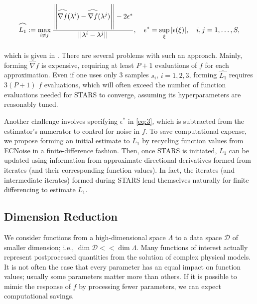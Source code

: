 \documentclass{amsart}
\newcommand{\D}{\mathcal{D}}
\newcommand\reallywidehat[1]{\arraycolsep=0pt\relax%
\begin{array}{c}
\stretchto{
  \scaleto{
    \scalerel*[\widthof{\ensuremath{#1}}]{\kern-.5pt\bigwedge\kern-.5pt}
    {\rule[-\textheight/2]{1ex}{\textheight}} %
  }{\textheight} %
}{0.5ex}\\           %
#1\\                 %
\rule{-1ex}{0ex}
\end{array}
}
\begin{document}
\begin{equation} \label{eq:3}
\reallywidehat{L_1}:= \max_{i \neq j} \frac{\left|\left|\reallywidehat{\nabla f}(\lambda^{i})-\reallywidehat{\nabla f}(\lambda^{j})\right|\right|-2\epsilon^*}{||\lambda^{i}-\lambda^{j}||}, \quad \epsilon^*=\sup_\xi |\epsilon(\xi)|, \quad i,j=1,\ldots, S,
\end{equation} 

\noindent which is %
given in \cite{Calliess}. There are several problems with such an approach. Mainly, forming $\hat{\nabla} f$ is expensive, requiring at least $P+1$ evaluations of $f$ for each approximation. Even if one uses only 3 samples $s_i$, $i=1,2,3$, forming $\hat{L_1}$ requires $3(P+1)$ $f$ evaluations, which will often exceed the number of function evaluations needed for STARS to converge, assuming its hyperparameters are reasonably tuned.

Another challenge involves specifying $\epsilon^*$ in \eqref{eq:3}, which is subtracted from the estimator's numerator to control for noise in $f$. To save computational expense, we propose forming an initial estimate to $L_1$ by recycling function values from ECNoise in a finite-difference fashion. Then, once STARS is initiated, $L_1$ can be updated using information from approximate directional derivatives formed from iterates (and their corresponding function values). In fact, the iterates (and intermediate iterates) formed during STARS lend themselves naturally for finite differencing to estimate $L_1$.






\subsection{Dimension Reduction}
We consider functions from a high-dimensional space $\Lambda$ to a data space $\D$ of smaller dimension; i.e., $\dim \D << \dim \Lambda$. Many functions of interest
actually represent postprocessed quantities from the solution of complex physical models. 
It is not often the case that every parameter has an equal impact on function values; usually some parameters matter more than others. If it is possible to mimic the response of $f$ by processing fewer parameters, we can expect computational savings.
\end{document}
